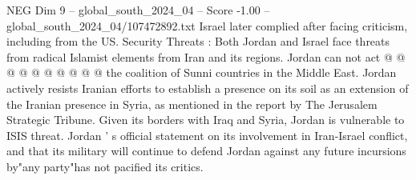 \begin{textsample}{NEG Dim 9 – global\_south\_2024\_04 – Score -1.00 – global\_south\_2024\_04/107472892.txt}
Israel later complied after facing criticism, including from the US.
Security Threats : Both Jordan and Israel face threats from radical Islamist elements from Iran and its regions.
Jordan can not act @ @ @ @ @ @ @ @ @ @ the coalition of Sunni countries in the Middle East.
Jordan actively resists Iranian efforts to establish a presence on its soil as an extension of the Iranian presence in Syria, as mentioned in the report by The Jerusalem Strategic Tribune.
Given its borders with Iraq and Syria, Jordan is vulnerable to ISIS threat.
Jordan ' s official statement on its involvement in Iran-Israel conflict, and that its military will continue to defend Jordan against any future incursions by"any party"has not pacified its critics.

\end{textsample}
